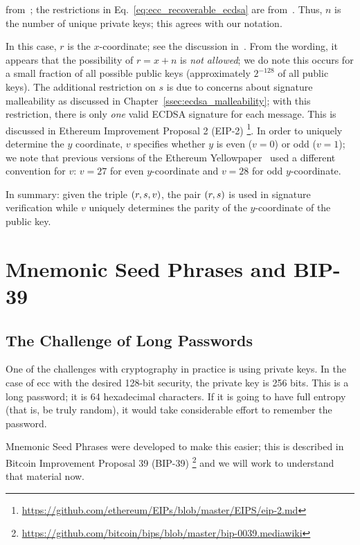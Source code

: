 \noindent
from~\cite[Eq.~313]{EthereumYellowpaper};
the restrictions in Eq.~\eqref{eq:ecc_recoverable_ecdsa}
are from~\cite[Eqs.~310--312]{EthereumYellowpaper}.
Thus, $n$ is the number of unique private keys;
this agrees with our notation.

In this case, $r$ is the $x$-coordinate;
see the discussion in~\cite[Appendix F]{EthereumYellowpaper}.
From the wording, it appears that the possibility
of $r = x + n$ is \emph{not allowed};
we do note this occurs for a small fraction of all possible
public keys (approximately $2^{-128}$ of all public keys).
The additional restriction on $s$ is due to concerns about signature
malleability as discussed in Chapter~\ref{ssec:ecdsa_malleability};
with this restriction, there is only \emph{one} valid ECDSA signature
for each message.
This is discussed in Ethereum Improvement Proposal 2 (EIP-2)%
\footnote{\url{https://github.com/ethereum/EIPs/blob/master/EIPS/eip-2.md}}.
In order to uniquely determine the $y$ coordinate, $v$ specifies
whether $y$ is even ($v=0$) or odd ($v=1$);
we note that previous versions of the
Ethereum Yellowpaper~\cite[Appendix F]{EthereumYellowpaperOct2019}
used a different convention for $v$: $v=27$ for even $y$-coordinate
and $v=28$ for odd $y$-coordinate.

In summary: given the triple $\left( r,s,v \right)$,
the pair $\left( r,s \right)$ is used in signature verification
while $v$ uniquely determines the parity of the $y$-coordinate
of the public key.



\section{Mnemonic Seed Phrases and BIP-39}
\label{sec:ecc_bip39}

\subsection{The Challenge of Long Passwords}

One of the challenges with cryptography in practice is using private keys.
In the case of \gls{ecc} with the desired 128-bit security,
the private key is 256 bits.
This is a long password; it is 64 hexadecimal characters.
If it is going to have full entropy (that is, be truly random),
it would take considerable effort to remember the password.

Mnemonic Seed Phrases were developed to make this easier;
this is described in Bitcoin Improvement Proposal 39 (BIP-39)%
\footnote{\url{https://github.com/bitcoin/bips/blob/master/bip-0039.mediawiki}}
and we will work to understand that material now.

